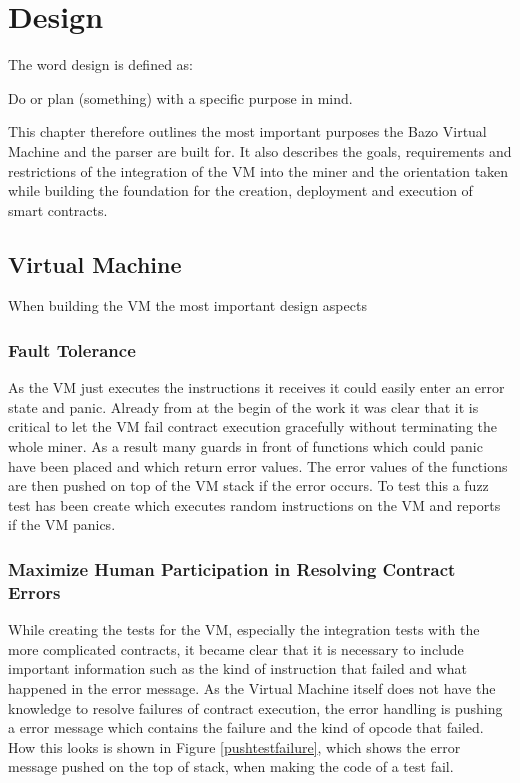 \chapter{Design} \label{design_chapter}
\thispagestyle{main} %
The word design is defined as:

Do or plan (something) with a specific purpose in mind. \cite{design_definition}

This chapter therefore outlines the most important purposes the Bazo Virtual Machine and the parser are built for. It also describes the goals, requirements and restrictions of the integration of the VM into the miner and the orientation taken while building the foundation for the creation, deployment and execution of smart contracts.

\section{Virtual Machine}
When building the VM the most important design aspects

\subsection{Fault Tolerance}
As the VM just executes the instructions it receives it could easily enter an error state and panic. Already from at the begin of the work it was clear that it is critical to let the VM fail contract execution gracefully without terminating the whole miner. As a result many guards in front of functions which could panic have been placed and which return error values. The error values of the functions are then pushed on top of the VM stack if the error occurs. To test this a fuzz test has been create which executes random instructions on the VM and reports if the VM panics. 
\subsection{Maximize Human Participation in Resolving Contract Errors}
While creating the tests for the VM, especially the integration tests with the more complicated contracts, it became clear that it is necessary to include important information such as the kind of instruction that failed and what happened in the error message. As the Virtual Machine itself does not have the knowledge to resolve failures of contract execution, the error handling is pushing a error message which contains the failure and the kind of opcode that failed. How this looks is shown in Figure \ref{pushtestfailure}, which shows the error message pushed on the top of stack, when making the code of a test fail.

